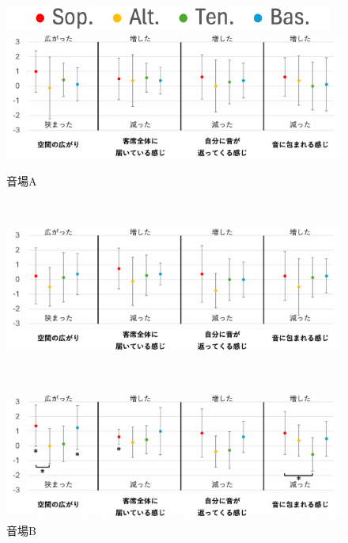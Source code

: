 \documentclass[11pt,a4j]{jreport}
\begin{document}
  
  \newpage
  \begin{figure}[H]
    \centering
    
    \begin{minipage}{1\linewidth}
      \centering
      \includegraphics[scale=.55]{images/subjectiveExp/statisticAnalysis/part_legend.pdf}
    \end{minipage}
    \vspace{.5\baselineskip}

    \begin{minipage}{1\linewidth}
      \centering
      \includegraphics[scale=.55]{images/subjectiveExp/statisticAnalysis/part_space_a.pdf}
      \caption*{音場A}
      \label{fig:空間の印象A}
    \end{minipage}
    \\
    \vspace{1\baselineskip}
    \begin{minipage}{1\linewidth}
      \centering
      \includegraphics[scale=.55]{images/subjectiveExp/statisticAnalysis/part_space_b.pdf}
      \caption*{音場B}
      \label{fig:空間の印象B}
    \end{minipage}
    \\
    \vspace{1\baselineskip}
    \begin{minipage}{1\linewidth}
      \centering
      \includegraphics[scale=.55]{images/subjectiveExp/statisticAnalysis/part_space_c.pdf}

\end{minipage}
\end{figure}
\end{document}
